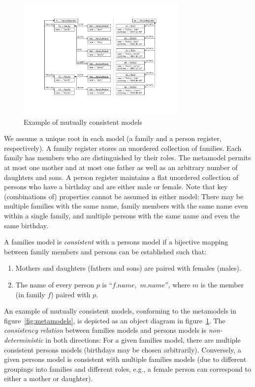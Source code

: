 \begin{figure}[tb!]
	\centering
	\includegraphics[width=0.75\textwidth]{diagrams/f2p-case/Models}
	\caption{Example of mutually consistent models}
	\label{fig:models}
\end{figure}

We assume a unique root in each model (a family and a person register, respectively). 
A family register stores an unordered collection of families. 
Each family has members who are distinguished by their roles. 
The metamodel permits at most one mother and at most one father as well as an arbitrary number of daughters and sons. 
A person register maintains a flat unordered collection of persons who have a birthday and are either male or female. 
Note that key (combinations of) properties cannot be assumed in either model: There may be multiple families with the same name, family members with the same name even within a single family, and multiple persons with the same name and even the same birthday. 

A families model is \emph{consistent} with a persons model if a bijective mapping between family members and persons can be established such that:

\begin{enumerate}
	\item  Mothers and daughters (fathers and sons) are paired with females (males).
	\item  The name of every person $p$ is ``$f.name$,~$m.name$'', where $m$ is the member (in family $f$) paired with $p$.
\end{enumerate}

An example of mutually consistent models, conforming to the metamodels in figure~\ref{fig:metamodels}, is depicted as an object diagram in figure~\ref{fig:models}. 
%
The \emph{consistency relation} between families models and persons models is \emph{non-deterministic} in both directions: For a given families model, there are multiple consistent persons models (birthdays may be chosen arbitrarily). 
Conversely, a given persons model is consistent with multiple families models (due to different groupings into families and different roles, e.g., a female person can correspond to either a mother or daughter).

